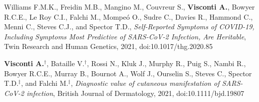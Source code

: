 {\begin{itemize}
 	   	Williams F.M.K., Freidin M.B., Mangino M., Couvreur S., \textbf{Visconti A.}, Bowyer R.C.E., Le Roy C.I., Falchi M., Mompe\'o O., Sudre C., Davies R., Hammond C., Menni C., Steves C.J., and Spector T.D., \emph{Self-Reported Symptoms of COVID-19, Including Symptoms Most Predictive of SARS-CoV-2 Infection, Are Heritable}, Twin Research and Human Genetics, 2021, doi:10.1017/thg.2020.85
		
	     \textbf{Visconti A.}$^{\textbf{$\dag $}}$, Bataille V.$^{\textbf{$\dag $}}$, Rossi N., Kluk J., Murphy R., Puig S., Nambi R., Bowyer R.C.E., Murray B., Bournot A., Wolf J., Ourselin S., Steves C., Spector T.D.$^{\textbf{$\ddag $}}$, and Falchi M.$^{\textbf{$\ddag $}}$, \emph{Diagnostic value of cutaneous manifestation of SARS-CoV-2 infection}, British Journal of Dermatology, 2021, doi:10.1111/bjd.19807
		
		
	\end{itemize}
}

